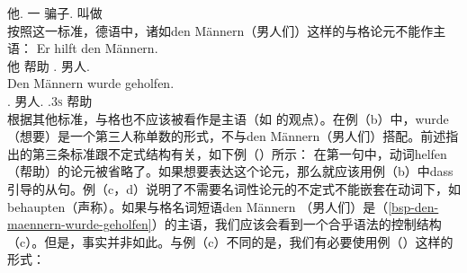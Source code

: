      他.\nom{} \passivepst{} 一 骗子.\nom{} 叫做\\
\zl
按照这一标准，德语中，诸如den Männern（男人们）这样的与格论元不能作主语：
\eal
\ex 
\gll Er hilft den Männern.\\
	 他 帮助 .\dat{} 男人.\dat{}\\
\ex
\label{bsp-den-maennern-wurde-geholfen}
\gll Den Männern wurde geholfen.\\
     .\dat{} 男人.\dat{} \passivepst.3\textsc{s} 帮助\\
\zl
根据其他标准，与格也不应该被看作是主语（如 \citet{Reis82}的观点）。在例（b）中，wurde（想要）是一个第三人称单数的形式，不与den Männern（男人们）搭配。前述指出的第三条标准跟不定式结构有关，如下例（）所示：
\eal
{}
\zl
%
在第一句中，动词helfen（帮助）的论元被省略了。如果想要表达这个论元，那么就应该用例（b）中dass引导的从句。例（c，d）说明了不需要名词性论元的不定式不能嵌套在动词下，如behaupten（声称）。如果与格名词短语den Männern
（男人们）是（\ref{bsp-den-maennern-wurde-geholfen}）的主语，我们应该会看到一个合乎语法的控制结构（c）。但是，事实并非如此。与例（c）不同的是，我们有必要使用例（）这样的形式：
